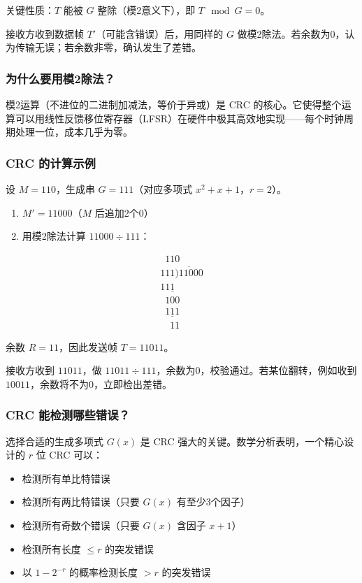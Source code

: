 关键性质：$T$ 能被 $G$ 整除（模2意义下），即 $T \mod G = 0$。

接收方收到数据帧 $T'$（可能含错误）后，用同样的 $G$ 做模2除法。若余数为0，认为传输无误；若余数非零，确认发生了差错。

\subsubsection{为什么要用模2除法？}

模2运算（不进位的二进制加减法，等价于异或）是 CRC 的核心。它使得整个运算可以用线性反馈移位寄存器（LFSR）在硬件中极其高效地实现——每个时钟周期处理一位，成本几乎为零。

\subsubsection{CRC 的计算示例}

设 $M = 110$，生成串 $G = 111$（对应多项式 $x^2 + x + 1$，$r = 2$）。

\begin{enumerate}
    \item $M' = 11000$（$M$ 后追加2个0）
    \item 用模2除法计算 $11000 \div 111$：
\end{enumerate}

\[
\begin{array}{r}
    \phantom{0}110 \\
    111 \overline{)11000} \\
    \underline{111\phantom{00}} \\
    \phantom{1}100 \\
    \phantom{1}\underline{111} \\
    \phantom{11}11
\end{array}
\]

余数 $R = 11$，因此发送帧 $T = 11011$。

接收方收到 $11011$，做 $11011 \div 111$，余数为0，校验通过。若某位翻转，例如收到 $10011$，余数将不为0，立即检出差错。

\subsubsection{CRC 能检测哪些错误？}

选择合适的生成多项式 $G(x)$ 是 CRC 强大的关键。数学分析表明，一个精心设计的 $r$ 位 CRC 可以：

\begin{itemize}
    \item 检测所有单比特错误
    \item 检测所有两比特错误（只要 $G(x)$ 有至少3个因子）
    \item 检测所有奇数个错误（只要 $G(x)$ 含因子 $x+1$）
    \item 检测所有长度 $\leq r$ 的突发错误
    \item 以 $1 - 2^{-r}$ 的概率检测长度 $> r$ 的突发错误
\end{itemize}

